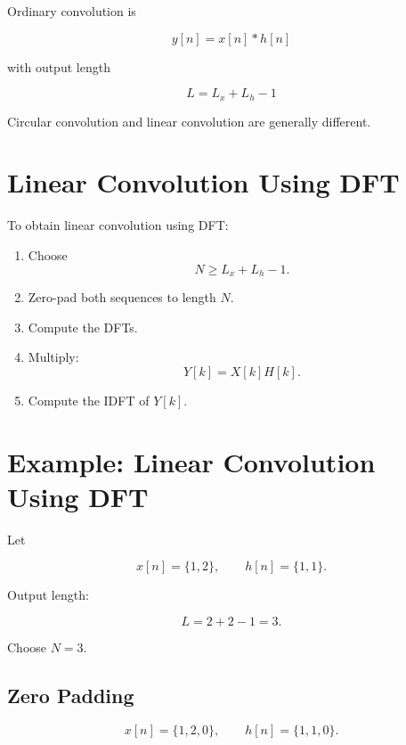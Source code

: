 Ordinary convolution is

\[
\boxed{
y[n]=x[n]*h[n]
}
\]

with output length

\[
\boxed{
L=L_x+L_h-1
}
\]

Circular convolution and linear convolution are generally different.


\section{Linear Convolution Using DFT}

To obtain linear convolution using DFT:

\begin{enumerate}
\item Choose
\[
N\ge L_x+L_h-1.
\]

\item Zero-pad both sequences to length \(N\).

\item Compute the DFTs.

\item Multiply:
\[
Y[k]=X[k]H[k].
\]

\item Compute the IDFT of \(Y[k]\).
\end{enumerate}


\section{Example: Linear Convolution Using DFT}

Let

\[
x[n]=\{1,2\},
\qquad
h[n]=\{1,1\}.
\]

Output length:

\[
L=2+2-1=3.
\]

Choose \(N=3\).


\subsection{Zero Padding}

\[
x[n]=\{1,2,0\},
\qquad
h[n]=\{1,1,0\}.
\]

